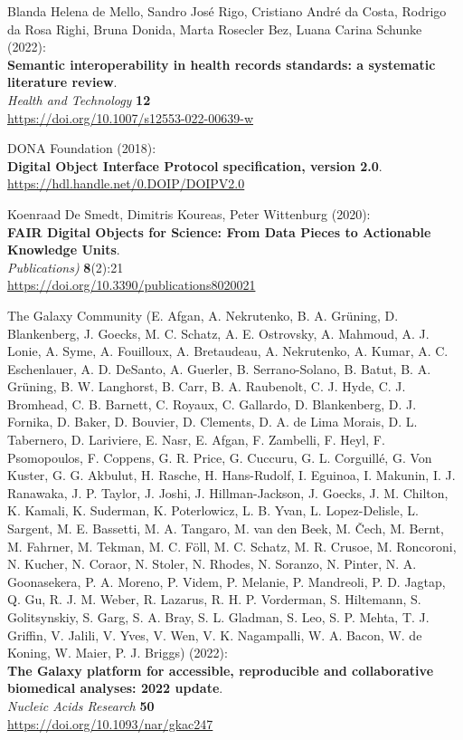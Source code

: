 \begin{thebibliography}{9}
 Blanda Helena de Mello, Sandro José Rigo, Cristiano
André da Costa, Rodrigo da Rosa Righi, Bruna Donida, Marta Rosecler Bez,
Luana Carina Schunke (2022):\\
\textbf{Semantic interoperability in health records standards: a
systematic literature review}.\\
\emph{Health and Technology} \textbf{12}\\
\url{https://doi.org/10.1007/s12553-022-00639-w}

 DONA Foundation (2018):\\
\textbf{Digital Object Interface Protocol specification, version 2.0}.\\
\url{https://hdl.handle.net/0.DOIP/DOIPV2.0}

 Koenraad De Smedt, Dimitris Koureas, Peter
Wittenburg (2020):\\
\textbf{FAIR Digital Objects for Science: From Data Pieces to Actionable
Knowledge Units}.\\
\emph{Publications)} \textbf{8}(2):21\\
\url{https://doi.org/10.3390/publications8020021}




 The Galaxy Community (E. Afgan, A. Nekrutenko, B. A.
Grüning, D. Blankenberg, J. Goecks, M. C. Schatz, A. E. Ostrovsky, A.
Mahmoud, A. J. Lonie, A. Syme, A. Fouilloux, A. Bretaudeau, A.
Nekrutenko, A. Kumar, A. C. Eschenlauer, A. D. DeSanto, A. Guerler, B.
Serrano-Solano, B. Batut, B. A. Grüning, B. W. Langhorst, B. Carr, B. A.
Raubenolt, C. J. Hyde, C. J. Bromhead, C. B. Barnett, C. Royaux, C.
Gallardo, D. Blankenberg, D. J. Fornika, D. Baker, D. Bouvier, D.
Clements, D. A. de Lima Morais, D. L. Tabernero, D. Lariviere, E. Nasr,
E. Afgan, F. Zambelli, F. Heyl, F. Psomopoulos, F. Coppens, G. R. Price,
G. Cuccuru, G. L. Corguillé, G. Von Kuster, G. G. Akbulut, H. Rasche, H.
Hans-Rudolf, I. Eguinoa, I. Makunin, I. J. Ranawaka, J. P. Taylor, J.
Joshi, J. Hillman-Jackson, J. Goecks, J. M. Chilton, K. Kamali, K.
Suderman, K. Poterlowicz, L. B. Yvan, L. Lopez-Delisle, L. Sargent, M.
E. Bassetti, M. A. Tangaro, M. van den Beek, M. Čech, M. Bernt, M.
Fahrner, M. Tekman, M. C. Föll, M. C. Schatz, M. R. Crusoe, M.
Roncoroni, N. Kucher, N. Coraor, N. Stoler, N. Rhodes, N. Soranzo, N.
Pinter, N. A. Goonasekera, P. A. Moreno, P. Videm, P. Melanie, P.
Mandreoli, P. D. Jagtap, Q. Gu, R. J. M. Weber, R. Lazarus, R. H. P.
Vorderman, S. Hiltemann, S. Golitsynskiy, S. Garg, S. A. Bray, S. L.
Gladman, S. Leo, S. P. Mehta, T. J. Griffin, V. Jalili, V. Yves, V. Wen,
V. K. Nagampalli, W. A. Bacon, W. de Koning, W. Maier, P. J. Briggs)
(2022):\\
\textbf{The Galaxy platform for accessible, reproducible and
collaborative biomedical analyses: 2022 update}.\\
\emph{Nucleic Acids Research} \textbf{50}\\
\url{https://doi.org/10.1093/nar/gkac247}


\end{thebibliography}
